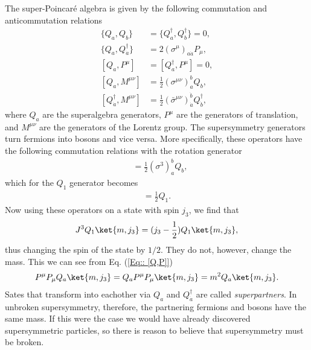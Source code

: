\documentclass[twoside,english]{uiofysmaster}
\begin{document}
The super-Poincar\'{e} algebra is given by the following commutation and anticommutation relations \cite{kvellestad2015chasing}
\begin{align}
\{Q_a, Q_b \} &= \{ Q_a^{\dagger}, Q_b^{\dagger}\} = 0,\\
\{Q_a, Q_{\dot{a}}^{\dagger} \} &= 2 (\sigma^{\mu})_{a \dot{a}} P_{\mu},\\
[Q_a, P^{\mu}] &= [Q_a^{\dagger}, P^{\mu}] = 0,\label{Eq:: [Q,P]}\\
[Q_a, M^{\mu \nu}] &= \frac{1}{2} (\sigma^{\mu \nu})_a^b Q_b,\\
[Q_{\dot{a}}^{\dagger}, M^{\mu \nu}] &= \frac{1}{2} (\bar{\sigma}^{\mu \nu})_{\dot{a}}^{\dot{b}} Q_{\dot{b}}^{\dagger},  
\end{align}
where $Q_a$ are the superalgebra generators, $P^{\mu}$ are the generators of translation, and $M^{\mu \nu}$ are the generators of the Lorentz group. The supersymmetry generators turn fermions into bosons and vice versa. More specifically, these operators have the following commutation relations with the rotation generator
\begin{align}
[ Q_a, J^3] &= \frac{1}{2} (\sigma^3)_a^bQ_b, 
\end{align}
which for the $Q_1$ generator becomes
\begin{align}
[Q_1, J^3] = \frac{1}{2} Q_1.
\end{align}
Now using these operators on a state with spin $j_3$, we find that
\begin{align}
J^3 Q_1 \ket{m, j_3} = (j_3 - \frac{1}{2}) Q_1 \ket{m, j_3},
\end{align}
thus changing the spin of the state by $1/2$. They do not, however, change the mass. This we can see from Eq. (\ref{Eq:: [Q,P]})
\begin{align}
P^{\mu} P_{\mu} Q_a \ket{m, j_3} = Q_a P^{\mu} P_{\mu} \ket{m, j_3} = m^2 Q_a \ket{m, j_3}.
\end{align}
Sates that transform into eachother via $Q_a$ and $Q_{\dot{a}}^{\dagger}$ are called \textit{superpartners}. In unbroken supersymmetry, therefore, the partnering fermions and bosons have the same mass. If this were the case we would have already discovered supersymmetric particles, so there is reason to believe that supersymmetry must be broken.
\end{document}
